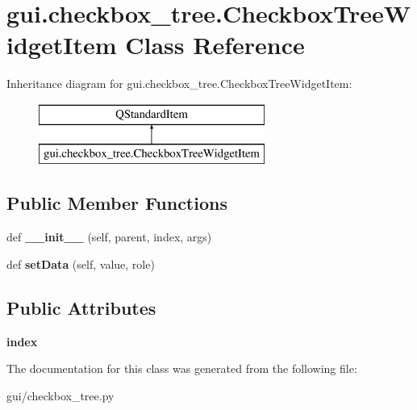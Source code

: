 \hypertarget{classgui_1_1checkbox__tree_1_1_checkbox_tree_widget_item}{}\section{gui.\+checkbox\+\_\+tree.\+Checkbox\+Tree\+Widget\+Item Class Reference}
\label{classgui_1_1checkbox__tree_1_1_checkbox_tree_widget_item}
Inheritance diagram for gui.\+checkbox\+\_\+tree.\+Checkbox\+Tree\+Widget\+Item\+:\begin{figure}[H]
\begin{center}
\leavevmode
\includegraphics[height=2.000000cm]{d0/d26/classgui_1_1checkbox__tree_1_1_checkbox_tree_widget_item}
\end{center}
\end{figure}
\subsection*{Public Member Functions}
\begin{DoxyCompactItemize}
\item 
\mbox{\label{classgui_1_1checkbox__tree_1_1_checkbox_tree_widget_item_a58d9e5d90de266b1d02e084b94bb8594}} 
def {\bfseries \+\_\+\+\_\+init\+\_\+\+\_\+} (self, parent, index, args)
\item 
\mbox{\label{classgui_1_1checkbox__tree_1_1_checkbox_tree_widget_item_aabc6f1ebf0f7e2281cdbab19741a0cd8}} 
def {\bfseries set\+Data} (self, value, role)
\end{DoxyCompactItemize}
\subsection*{Public Attributes}
\begin{DoxyCompactItemize}
\item 
\mbox{\label{classgui_1_1checkbox__tree_1_1_checkbox_tree_widget_item_a5c00e24f14f3efa50b9c60d2abd4551b}} 
{\bfseries index}
\end{DoxyCompactItemize}


The documentation for this class was generated from the following file\+:\begin{DoxyCompactItemize}
\item 
gui/checkbox\+\_\+tree.\+py\end{DoxyCompactItemize}
